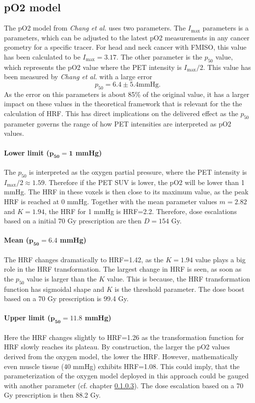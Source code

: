 \subsection{pO2 model}
The pO2 model from \textit{Chang et al.} uses two parameters. The $I_\mathrm{max}$ parameters is a parameters, which can be adjusted to the latest pO2 measurements in any cancer geometry for a specific tracer. For head and neck cancer with FMISO, this value has been calculated to be $I_\mathrm{max}=3.17$. The other parameter is the $p_{50}$ value, which represents the pO2 value where the PET intensity is $I_\mathrm{max}/2$. This value has been measured by \textit{Chang et al.} with a large error
\begin{equation}
p_\mathrm{50} = 6.4 \pm 5.4 \mathrm{mmHg}.
\end{equation}
As the error on this parameters is about 85\% of the original value, it has a larger impact on these values in the theoretical framework that is relevant for the the calculation of HRF. This has direct implications on the delivered effect as the $p_{50}$ parameter governs the range of how PET intensities are interpreted as pO2 values.
\paragraph{Lower limit ($\mathbf{p_{50}=1}$ mmHg)}The $p_{50}$ is interpreted as the oxygen partial pressure, where the PET intensity is $I_\mathrm{max}/2\approx 1.59$. Therefore if the PET SUV is lower, the pO2 will be lower than 1 mmHg. The HRF in these voxels is then close to its maximum value, as the peak HRF is reached at 0 mmHg. Together with the mean parameter values $m=2.82$ and $K=1.94$, the HRF for 1 mmHg is HRF=2.2. Therefore, dose escalations based on a initial 70 Gy prescription are then $D=154$ Gy.
\paragraph{Mean ($\mathbf{p_{50}=6.4}$ mmHg)}The HRF changes dramatically to HRF=1.42, as the $K=1.94$ value plays a big role in the HRF transformation. The largest change in HRF is seen, as soon as the $p_{50}$ value is larger than the $K$ value. This is because, the HRF transformation function has sigmoidal shape and $K$ is the threshold parameter. The dose boost based on a 70 Gy prescription is 99.4 Gy.
\paragraph{Upper limit ($\mathbf{p_{50}=11.8}$ mmHg)}Here the HRF changes slightly to HRF=1.26 as the transformation function for HRF slowly reaches its plateau. By construction, the larger the pO2 values derived from the oxygen model, the lower the HRF. However, mathematically even muscle tissue (40 mmHg) exhibits HRF=1.08. This could imply, that the parameterization of the oxygen model deployed in this approach could be gauged with another parameter (cf. chapter \ref{}). The dose escalation based on a 70 Gy prescription is then 88.2 Gy.
